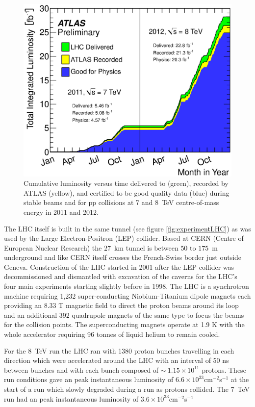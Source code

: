 	\begin{figure}[h!]
        \begin{center}
			\includegraphics[width=0.9\linewidth]{images/intlumivstime2011-2012DQ.eps}
        \end{center}
        \caption{Cumulative luminosity versus time delivered to (green), recorded by ATLAS (yellow), and certified to be good quality data (blue) during stable beams and for pp collisions at 7 and 8~TeV centre-of-mass energy in 2011 and 2012. \cite{LuPublicResults}}
        \label{fig:lum}
    \end{figure}

	
	The LHC itself is built in the same tunnel (see figure \ref{fig:experimentLHC}) as was used by the Large Electron-Positron (LEP) collider. Based at CERN (Centre of European Nuclear Research) the $27$~km tunnel is between $50$ to $175$~m underground and like CERN itself crosses the French-Swiss border just outside Geneva. Construction of the LHC started in 2001 after the LEP collider was decommissioned and dismantled with excavation of the caverns for the LHC's four main experiments starting slightly before in 1998. The LHC is a synchrotron machine requiring 1,232 super-conducting Niobium-Titanium dipole magnets each providing an 8.33 T magnetic field to direct the proton beams around its loop and an additional 392 quadrupole magnets of the same type to focus the beams for the collision points. The superconducting magnets operate at 1.9 K with the whole accelerator requiring 96 tonnes of liquid helium to remain cooled.


	For the 8~TeV run the LHC ran with 1380 proton bunches travelling in each direction which were accelerated around the LHC with an interval of 50 ns between bunches and with each bunch composed of $\sim~1.15\times10^{11}$ protons. These run conditions gave an peak instantaneous luminosity of $6.6\times10^{33}$cm$^{-2}$s$^{-1}$ at the start of a run which slowly degraded during a run as protons collided. The 7~TeV run had an peak instantaneous luminosity of $3.6\times10^{33}$cm$^{-2}$s$^{-1}$


